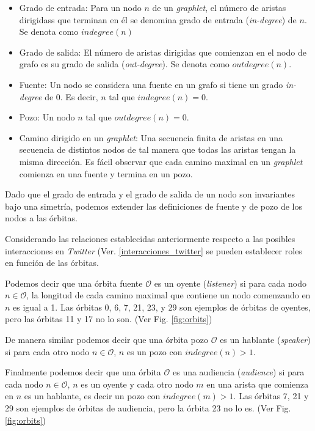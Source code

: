 \begin{itemize}
    \item Grado de entrada: Para un nodo $n$ de un \textit{graphlet}, el número de aristas dirigidass que terminan en él se denomina grado de entrada (\textit{in-degree}) de $n$. Se denota como $indegree(n)$
    \item Grado de salida: El número de aristas dirigidas que comienzan en el nodo de grafo es su grado de salida (\textit{out-degree}). Se denota como $outdegree(n)$.
    \item Fuente: Un nodo se considera una fuente en un grafo si tiene un grado \textit{in-degree} de 0. Es decir, $n$ tal que $indegree(n)=0$. 
    \item Pozo: Un nodo $n$ tal que $outdegree(n)=0$.
    \item Camino dirigido en un \textit{graphlet}: Una secuencia finita de aristas en una secuencia de distintos nodos de tal manera que todas las aristas tengan la misma dirección. Es fácil observar que cada camino maximal en un \textit{graphlet} comienza en una fuente y termina en un pozo. %
\end{itemize}

Dado que el grado de entrada y el grado de salida de un nodo son invariantes bajo una simetría, podemos extender las definiciones de fuente y de pozo de los nodos a las órbitas. 

Considerando las relaciones establecidas anteriormente respecto a las posibles interacciones en \textit{Twitter} (Ver. \ref{interacciones_twitter} se pueden establecer roles en función de las órbitas.

Podemos decir que una órbita fuente $\mathcal{O}$ es un oyente (\emph{listener}) si para cada nodo $n\in\mathcal{O}$, la longitud de cada camino maximal que contiene un nodo comenzando en $n$ es igual a 1. Las órbitas 0, 6, 7, 21, 23, y 29 son ejemplos de órbitas de oyentes, pero las órbitas 11 y 17 no lo son. (Ver Fig. \ref{fig:orbits})

De manera similar podemos decir que una órbita pozo $\mathcal{O}$ es un hablante (\emph{speaker}) si para cada otro nodo $n\in\mathcal{O}$, $n$ es un pozo con $indegree(n) > 1$. 

Finalmente podemos decir que una órbita $\mathcal{O}$ es una audiencia (\emph{audience}) si para cada nodo $n\in\mathcal{O}$, $n$ es un oyente y cada otro nodo $m$ en una arista que comienza en $n$ es un hablante, es decir un pozo con $indegree(m) > 1$. Las órbitas 7, 21 y 29 son ejemplos de órbitas de audiencia, pero la órbita 23 no lo es. (Ver Fig. \ref{fig:orbits})

